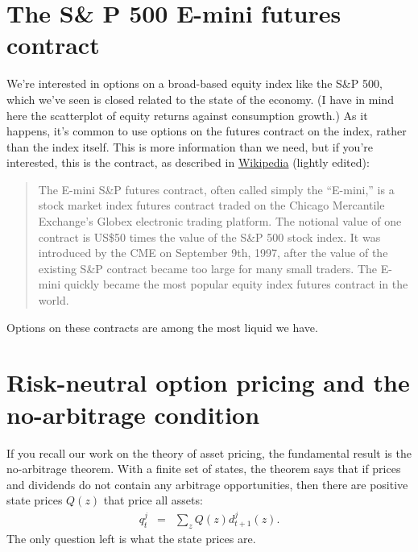 \documentclass[11pt]{article}
\begin{document}
\section{The S\& P 500 E-mini futures contract}

We're interested in options on a broad-based equity index
like the S\&P 500,
which we've seen is closed related to the state of the economy.
(I have in mind here the scatterplot of equity returns against
consumption growth.)
As it happens, it's common to use options on the futures contract on the index,
rather than the index itself.
This is more information than we need,
but if you're interested, this is the contract,
as described in
\href{http://en.wikipedia.org/wiki/E-mini_S&P}{Wikipedia}
(lightly edited):
%
\begin{quote}
The E-mini S\&P futures contract,
often called simply the ``E-mini,''
is a stock market index futures contract traded
on the Chicago Mercantile Exchange's Globex electronic trading platform.
The notional value of one contract is US\$50 times the value of the S\&P 500 stock index.
It was introduced by the CME on September 9th, 1997,
after the value of the existing S\&P contract became too large for many small traders.
The E-mini quickly became the most popular equity index futures contract in the world.
\end{quote}

Options on these contracts are among the most liquid we have.



\section{Risk-neutral option pricing and the no-arbitrage condition}

If you recall our work on the theory of asset pricing,
the fundamental result is the no-arbitrage theorem.
With a finite set of states,
the theorem says that if prices and dividends do not contain any arbitrage opportunities,
then there are positive state prices $Q(z)$ that price all
assets:
\begin{eqnarray}
    q^j_t  &=& \sum_z Q(z) d^j_{t+1}(z) .
    \label{eq:theorem}
\end{eqnarray}
The only question left is what the state prices are.
\end{document}
